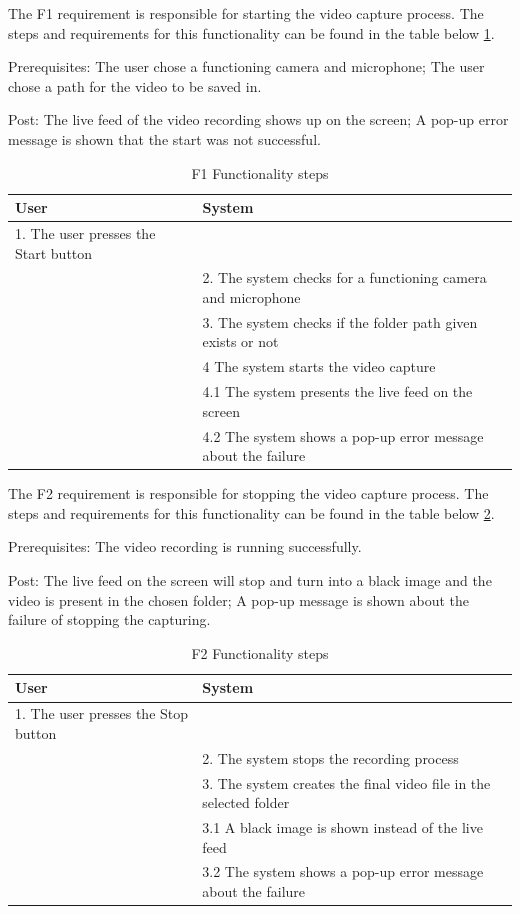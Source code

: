\par The F1 requirement is responsible for starting the video capture process. The steps and requirements for this functionality can be found in the table below \ref{F1Table}.
\par Prerequisites: The user chose a functioning camera and microphone; The user chose a path for the video to be saved in.
\par Post: The live feed of the video recording shows up on the screen; A pop-up error message is shown that the start was not successful.

\begin{table}[htbp]
\begin{center}
\begin{tabular}
{|p{180pt}|p{180pt}|}
\hline
 User & System\\
\hline 
\hline 1. The user presses the Start button &  \\
\hline  & 2. The system checks for a functioning camera and microphone \\
\hline  & 3. The system checks if the folder path given exists or not \\
\hline  & 4 The system starts the video capture \\
\hline  & 4.1 The system presents the live feed on the screen \\
\hline  & 4.2 The system shows a pop-up error message about the failure \\
\hline
\end{tabular}
\end{center}
\caption{F1 Functionality steps}
\label{F1Table}
\end{table}

\par The F2 requirement is responsible for stopping the video capture process. The steps and requirements for this functionality can be found in the table below \ref{F2Table}.
\par Prerequisites: The video recording is running successfully.
\par Post: The live feed on the screen will stop and turn into a black image and the video is present in the chosen folder; A pop-up message is shown about the failure of stopping the capturing.

\begin{table}[htbp]
\begin{center}
\begin{tabular}
{|p{180pt}|p{180pt}|}
\hline
 User & System\\
\hline 
\hline 1. The user presses the Stop button &  \\
\hline  & 2. The system stops the recording process \\
\hline  & 3. The system creates the final video file in the selected folder \\
\hline  & 3.1 A black image is shown instead of the live feed \\
\hline  & 3.2 The system shows a pop-up error message about the failure \\
\hline
\end{tabular}
\end{center}
\caption{F2 Functionality steps}
\label{F2Table}
\end{table}

